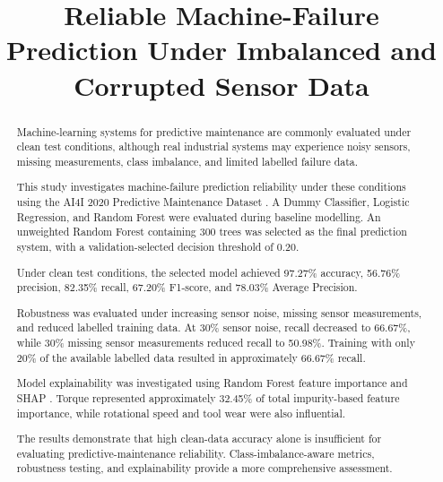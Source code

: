 \documentclass[conference]{IEEEtran}
\begin{document}

\title{Reliable Machine-Failure Prediction Under Imbalanced and Corrupted Sensor Data}

\author{
}

\maketitle


\begin{abstract}

Machine-learning systems for predictive maintenance are commonly evaluated under clean test conditions, although real industrial systems may experience noisy sensors, missing measurements, class imbalance, and limited labelled failure data.

This study investigates machine-failure prediction reliability under these conditions using the AI4I 2020 Predictive Maintenance Dataset \cite{uci_ai4i}. A Dummy Classifier, Logistic Regression, and Random Forest were evaluated during baseline modelling. An unweighted Random Forest containing 300 trees was selected as the final prediction system, with a validation-selected decision threshold of 0.20.

Under clean test conditions, the selected model achieved 97.27\% accuracy, 56.76\% precision, 82.35\% recall, 67.20\% F1-score, and 78.03\% Average Precision.

Robustness was evaluated under increasing sensor noise, missing sensor measurements, and reduced labelled training data. At 30\% sensor noise, recall decreased to 66.67\%, while 30\% missing sensor measurements reduced recall to 50.98\%. Training with only 20\% of the available labelled data resulted in approximately 66.67\% recall.

Model explainability was investigated using Random Forest feature importance and SHAP \cite{lundberg2017}. Torque represented approximately 32.45\% of total impurity-based feature importance, while rotational speed and tool wear were also influential.

The results demonstrate that high clean-data accuracy alone is insufficient for evaluating predictive-maintenance reliability. Class-imbalance-aware metrics, robustness testing, and explainability provide a more comprehensive assessment.

\end{abstract}
\end{document}
